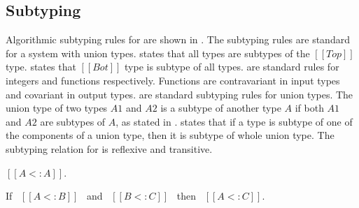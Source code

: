 \subsection{Subtyping}
\label{sec:union:sub}
Algorithmic subtyping rules for \cal are shown in
. The subtyping rules are standard for a system
with union types.  
 states that all types are subtypes of
the $[[Top]]$ type.  states that $[[Bot]]$ type is subtype of
all types.  are standard rules for integers and
functions respectively.  Functions are contravariant in input types
and covariant in output types.  are standard
subtyping rules for union types. The union type of two types $A1$ and $A2$
is a subtype of another type $A$ if both $A1$ and $A2$ are subtypes of
$A$, as stated in .  states that if a
type is subtype of one of the components of a union type, then it is subtype of whole
union type.  
The subtyping relation for \cal is reflexive and transitive.
\begin{lemma}
  $[[A <: A]]$.
\label{lemma:union:refl}
\end{lemma}
\begin{comment}
\begin{proof}
  By induction on type A. All cases are trivial to prove.
\end{proof}
\end{comment}
\begin{lemma}
  If \ $[[A <: B]]$ \ and \ $[[B <: C]]$ \ then \ $[[A <: C]]$.
  \label{lemma:union:trans}
\end{lemma}
\begin{comment}
\begin{proof}
  By induction on type B.
  \begin{itemize}
    \item Cases $[[Top]]$, $[[Bot]]$ and $[[Int]]$ are trivial to prove.
    \item Case $[[A -> B]]$ requires double induction on type $[[C]]$
          and $[[A]]$.
    \item Case $[[A \/ B]]$ requires \Cref{lemma:union:sub-or}
  \end{itemize}
\end{proof}\bruno{If space is a concern we can probably drop the lemma statements
for reflexivity and transitivity as these are quite standard.}

\begin{lemma}[Subtyping Union Inversion]
\label{lemma:union:sub-or}
  If \ $[[A \/ B <: C]]$ then:
  \begin{enumerate}
    \item $[[A <: C]]$ and
    \item $[[B <: C]]$
  \end{enumerate}
\end{lemma}
\end{comment}


